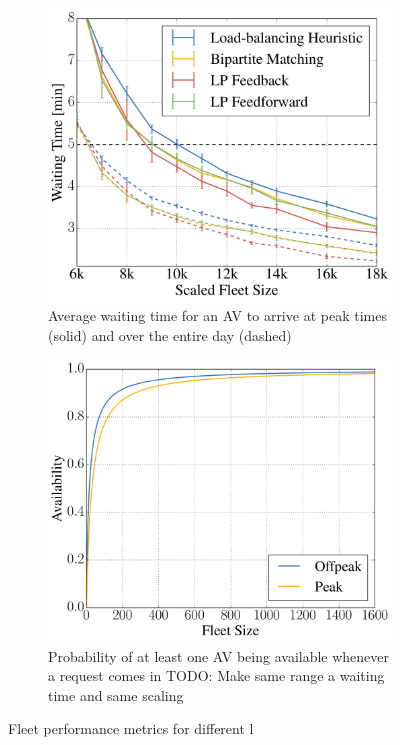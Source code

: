 \begin{figure}
    \centering
    \begin{subfigure}[t]{0.495\textwidth}
        \includegraphics[width=1.0\textwidth]{figures/mean_peak_waiting_times.pdf}
        \caption{Average waiting time for an AV to arrive at peak times (solid) and over the entire day (dashed)}
        \label{fig:mean_peak_waiting_times}
    \end{subfigure}\hfill
    \begin{subfigure}[t]{0.495\textwidth}
        \includegraphics[width=1.0\textwidth]{figures/availability.pdf}
        \caption{Probability of at least one AV being available whenever a request comes in
        TODO: Make same range a waiting time and same scaling}
        \label{fig:performanceavailability}
    \end{subfigure}
    \caption{Fleet performance metrics for different l}
\end{figure}







